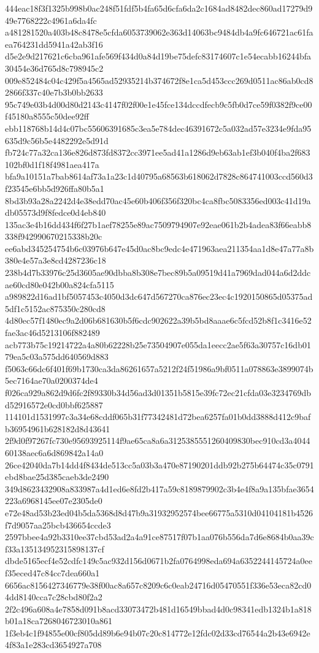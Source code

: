 {444eac18f3f1325b998b0ac248f51fdf5b4fa65d6cfa6da2c1684ad8482dec860ad17279d949e7768222c4961a6da4fc
a481281520a403b48c8478e5cfda6053739062e363d14063bc9484db4a9fc646721ac61faea764231dd5941a42ab3f16
d5e2e9d217621c6cba961afe569f434d0a84d19be75defc83174607c1e54ecabb16244bfa30454e36d765d8c798945c2
009e852484c04c429f5a4565ad52935214b374672f8e1ca5d453ccc269d0511ac86ab0cd82866f337c40e7b3b0bb2633
95c749e03b4d00d80d2143c4147f02f00e1e45fce134dccdfecb9c5fb0d7ce59f0382f9ce00f45180a8555c50dee92ff
ebb118768b14d4c07bc55606391685c3ea5e784dec46391672c5a032ad57e3234e9fda95635d9c56b5e4482292e5d91d
fb724c77a32ca136e826d873fd8372cc3971ee5ad41a1286d9eb63ab1ef3b040f4ba2f683102bf0d1f18f4981aea417a
bfa9a10151a7bab8614af73a1a23c1d40795a68563b618062d7828c864741003ccd560d3f23545e6bb5d926ffa80b5a1
8bd3b93a28a2242d4e38edd70ac45e60b406f356f320bc4ca8fbc5083356ed003c41d19adb05573d9f8fedce0d4eb840
135ac3e4b16dd434f6f27b1aef78255e89ac7509794907e92eae061b2b4adea83f66eabb8338f942990670215338b20c
ee6abd345254754b6c03976b647e45d0ac8bc9edc4e471963aea211354aa1d8e47a77a8b380e4e57a3e8cd4287236c18
238b4d7b33976c25d3605ae90dbba8b308e7bec89b5a09519d41a7969dad044a6d2ddcae60cd80e042b00a824cfa5115
a989822d16ad1bf5057453c4050d3dc647d567270ca876ec23ec4c1920150865d05375ad5df1c5152ac875350c280cd8
4d80ec57f1480ec9a2d06b681630b5f6cdc902622a39b5bd8aaae6c5fcd52b8f1c3416e52fae3ac46d5213106f882489
acb773b75c19214722a4a80b62228b25e73504907e055da1eecc2ae5f63a30757c16db0179ea5c03a575dd640569d883
f5063c66dc6f401f69b1730ca3da86261657a5212f24f51986a9bf0511a078863e3899074b5ec7164ae70a0200374de4
f026ca929a862d9d6fc2f89330b34d56ad3d01351b5815e39fc72ec21cfda03e3234769dbd52916572e0cd0bbf625887
114101d1531997c3a34e68cddf065b31f77342481d72bea6257fa01b0dd3888d412c9bafb36954961b628182d8d43641
2f9d0f97267fc730e95693925114f9ae65ca8a6a3125385551260409830bec910cd3a404460138aec6a6d869842a14a0
26ce42040da7b14dd4f8434de513cc5a03b3a470e87190201ddb92b275b64474c35c0791ebd8bae25d385caeb3de2490
349d8623432908a833987a4d1ed6e8fd2b417a59c8189879902c3b4e4f8a9a135bfae3654223a6968145ee07e2305de0
e72e48ad53b23ed04b5da5368d8d47b9a31932952574bee66775a5310d04104181b4526f7d9057aa25bcb436654ccde3
2597bbee4a92b3310ee37cbd53ad2a4a91ce87517f07b1aa076b556da7d6e8684b0aa39cf33a135134952315898137cf
dbde5165ecf4e52cdfc149c5ac932d156d0671b2fa0764998eda694a6352244145724a0eef35eced47c84cc7dea660a1
6656ac8156427346779e38f00ac8a657c8209c6c0eab24716d05470551f336e53eca82cd04dd8140cca7c28cbd80f2a2
2f2c496a608a4e7858d091b8acd33073472b481d16549bbad4d0c98341edb1324b1a818b01a18ca7268046723010a861
1f3eb4c1f94855e00cf805dd89b6e94b07c20c814772e12fdc02d33cd76544a2b43e6942e4f83a1e283cd3654927a708
}

